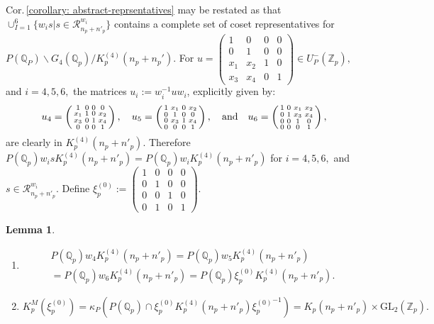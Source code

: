 \documentclass[11pt]{amsart}
\newtheorem{lemma}{Lemma}[section]
\newcommand{\GL}{\mathrm{GL}}
\newcommand{\mirp}[1]{K_p^{(4)}(#1)}
\begin{document}
Cor.\,\ref{corollary: abstract-reprsentatives} may be restated as that $\cup_{I=1}^6 \{w_i s | s \in \mathcal{R}_{n_p + n'_p}^{w_i}\}$ 
contains a complete set of coset representatives for $P(\mathbb{Q}_P) \backslash G_4(\mathbb{Q}_p) / \mirp{n_p+n_p'}.$
For $ u = \left(\begin{smallmatrix}
	1 & 0 & 0 & 0\\
	0 & 1 & 0 & 0\\
	x_1 & x_2 & 1 & 0\\
	x_3 & x_4 & 0 & 1
\end{smallmatrix}\right) \in U_P^{-}(\mathbb{Z}_p),$ and $i=4,5,6,$ the matrices $u_i := w_i^{-1}uw_i$, explicitly given by:
$$
 u_4= 
	\left(\begin{smallmatrix}
		1 & 0 & 0 & 0 \\
		x_1 & 1 & 0 & x_2\\
		x_3 & 0 & 1 & x_4 \\
		0 & 0 & 0 & 1
	\end{smallmatrix}\right), \quad 
	u_5= 
	\left(\begin{smallmatrix}
		1 & x_1 & 0 & x_2 \\
		0 & 1 & 0 & 0 \\
		0 & x_3 & 1 & x_4 \\
		0 & 0 & 0 & 1
	\end{smallmatrix}\right), \quad {\rm and} \quad 
	u_6 = 
	\left(\begin{smallmatrix}
		1 & 0 & x_1 & x_2 \\
		0 & 1 & x_3 & x_4 \\
		0 & 0 & 1 & 0 \\
		0 & 0 & 0 & 1
	\end{smallmatrix}\right), 
$$
are clearly in $\mirp{n_p + n'_p}.$ Therefore
$P(\mathbb{Q}_p) w_i s \mirp{n_p + n'_p} = P(\mathbb{Q}_p) w_i \mirp{n_p + n'_p}$ for $i=4,5,6,$ and $s \in \mathcal{R}_{n_p + n'_p}^{w_i}.$ 
Define
$%
	\xi_p^{(0)} := \left(\begin{smallmatrix}
		1 & 0 & 0 & 0 \\
		0 & 1 & 0 & 0 \\
		0 & 0 & 1 & 0 \\
		0 & 1 & 0 & 1
	\end{smallmatrix}\right). 
$%
\begin{lemma}
\label{Lem:some-coset-reductions}
\hfill%
\begin{enumerate}
\item[(i)] \begin{multline*}P(\mathbb{Q}_p)w_4\mirp{n_p + n'_p} = 	P(\mathbb{Q}_p)w_5\mirp{n_p + n'_p} \\ =
		P(\mathbb{Q}_p)w_6\mirp{n_p + n'_p} =	P(\mathbb{Q}_p)\xi_p^{(0)}\mirp{n_p + n'_p}.\end{multline*}

\smallskip
\item[(ii)] $K_p^M(\xi_p^{(0)}) = \kappa_P( P(\mathbb{Q}_p) \cap \xi_p^{(0)}  \mirp{n_p + n'_p} {\xi_p^{(0)}}^{-1} )  = K_p(n_p + n'_p) \times \GL_2(\mathbb{Z}_p).$
\end{enumerate}
\end{lemma}
\end{document}

